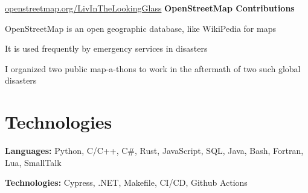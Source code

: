 	\vspace{0.2 cm}

	\begin{samepage}
		\begin{twocolentry}
			{\hspace{-3 cm} \href{https://openstreetmap.org/LivInTheLookingGlass}{\mbox{openstreetmap.org/LivInTheLookingGlass}} } \textbf{OpenStreetMap Contributions}
		\end{twocolentry}
	
		\begin{onecolentry}
			\begin{highlights}
				\item OpenStreetMap is an open geographic database, like WikiPedia for maps
				\item It is used frequently by emergency services in disasters
				\item I organized two public map-a-thons to work in the aftermath of two such global disasters
			\end{highlights}
		\end{onecolentry}
	\end{samepage}

	\section{Technologies}

	\begin{onecolentry}
		\textbf{Languages:} Python, C/C+\!+, C\#, Rust, JavaScript, SQL, Java, Bash,
		Fortran, Lua, SmallTalk
	\end{onecolentry}

	\begin{onecolentry}
		\textbf{Technologies:} Cypress, .NET, Makefile, CI/CD, Github Actions
	\end{onecolentry}

